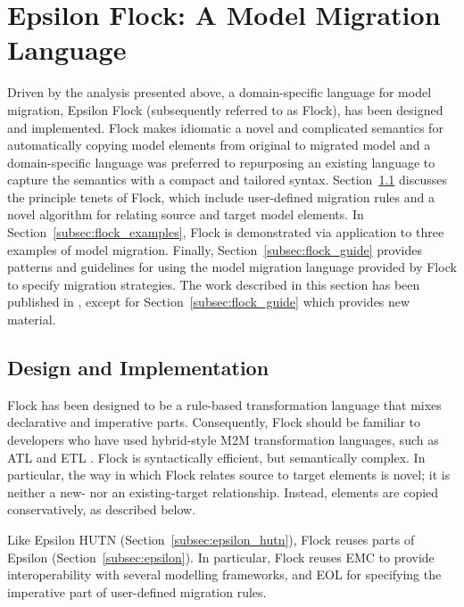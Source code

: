 
\section{Epsilon Flock: A Model Migration Language}
\label{sec:flock}
Driven by the analysis presented above, a domain-specific language for model migration, Epsilon Flock (subsequently referred to as Flock), has been designed and implemented. Flock makes idiomatic a novel and complicated semantics for automatically copying model elements from original to migrated model and a domain-specific language was preferred to repurposing an existing language to capture the semantics with a compact and tailored syntax. Section~\ref{subsec:flock_design} discusses the principle tenets of Flock, which include user-defined migration rules and a novel algorithm for relating source and target model elements. In Section~\ref{subsec:flock_examples}, Flock is demonstrated via application to three examples of model migration. Finally, Section~\ref{subsec:flock_guide} provides patterns and guidelines for using the model migration language provided by Flock to specify migration strategies. The work described in this section has been published in \cite{rose10flock}, except for Section~\ref{subsec:flock_guide} which provides new material.

\subsection{Design and Implementation}
\label{subsec:flock_design}
Flock has been designed to be a rule-based transformation language that mixes declarative and imperative parts. Consequently, Flock should be familiar to developers who have used hybrid-style M2M transformation languages, such as ATL and ETL \cite{kolovos08etl}. Flock is syntactically efficient, but semantically complex. In particular, the way in which Flock relates source to target elements is novel; it is neither a new- nor an existing-target relationship. Instead, elements are copied conservatively, as described below.

Like Epsilon HUTN (Section~\ref{subsec:epsilon_hutn}), Flock reuses parts of Epsilon (Section~\ref{subsec:epsilon}). In particular, Flock reuses EMC to provide interoperability with several modelling frameworks, and EOL for specifying the imperative part of user-defined migration rules.

